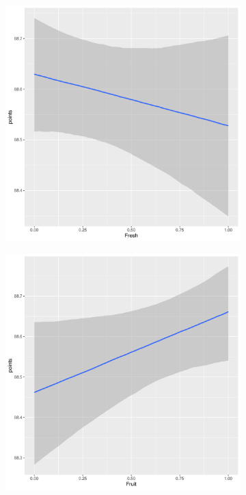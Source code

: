 \documentclass{article}
\begin{document}
\begin{figure}[htbp]
\begin{subfigure}{0.22\textwidth}
	\end{subfigure}\hfill
	\begin{subfigure}{0.22\textwidth}
		\includegraphics[width=\textwidth]{imgs/Rplots-17.pdf}
	\end{subfigure}\hfill
	\begin{subfigure}{0.22\textwidth}
		\includegraphics[width=\textwidth]{imgs/Rplots-18.pdf}
	\end{subfigure}
	

\end{figure}
\end{document}
